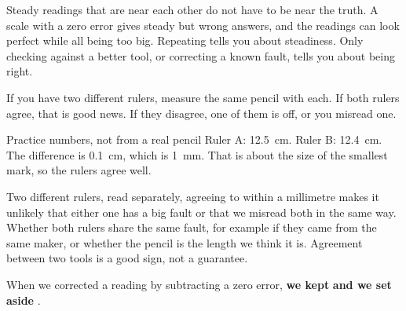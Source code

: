 \begin{center}
\end{center}
Steady readings that are near each other do not have to be near the truth. A scale with a zero error gives steady but wrong answers, and the readings can look perfect while all being too big. Repeating tells you about steadiness. Only checking against a better tool, or correcting a known fault, tells you about being right.

If you have two different rulers, measure the same pencil with each. If both rulers agree, that is good news. If they disagree, one of them is off, or you misread one.

\begin{worked}{Practice numbers, not from a real pencil}
Ruler A: 12.5~cm. Ruler B: 12.4~cm. The difference is 0.1~cm, which is 1~mm. That is about the size of the smallest mark, so the rulers agree well.
\end{worked}

{Two different rulers, read separately, agreeing to within a millimetre makes it unlikely that either one has a big fault or that we misread both in the same way.}
{Whether both rulers share the same fault, for example if they came from the same maker, or whether the pencil is the length we think it is. Agreement between two tools is a good sign, not a guarantee.}

\begin{keepbox}
When we corrected a reading by subtracting a zero error, \textbf{we kept} \wline[3.5cm] \textbf{and we set aside} \wline[3.5cm].
\end{keepbox}

\clearpage

